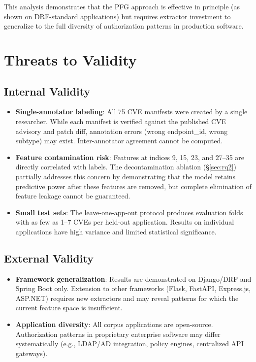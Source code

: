 This analysis demonstrates that the PFG approach is effective in principle (as shown on DRF-standard applications) but requires extractor investment to generalize to the full diversity of authorization patterns in production software.

\section{Threats to Validity}
\label{sec:threats}

\subsection{Internal Validity}

\begin{itemize}
    \item \textbf{Single-annotator labeling}: All 75 CVE manifests were created by a single researcher. While each manifest is verified against the published CVE advisory and patch diff, annotation errors (wrong endpoint\_id, wrong subtype) may exist. Inter-annotator agreement cannot be computed.

    \item \textbf{Feature contamination risk}: Features at indices 9, 15, 23, and 27--35 are directly correlated with labels. The decontamination ablation (\S\ref{sec:rq2}) partially addresses this concern by demonstrating that the model retains predictive power after these features are removed, but complete elimination of feature leakage cannot be guaranteed.

    \item \textbf{Small test sets}: The leave-one-app-out protocol produces evaluation folds with as few as 1--7 CVEs per held-out application. Results on individual applications have high variance and limited statistical significance.
\end{itemize}

\subsection{External Validity}

\begin{itemize}
    \item \textbf{Framework generalization}: Results are demonstrated on Django/DRF and Spring Boot only. Extension to other frameworks (Flask, FastAPI, Express.js, ASP.NET) requires new extractors and may reveal patterns for which the current feature space is insufficient.

    \item \textbf{Application diversity}: All corpus applications are open-source. Authorization patterns in proprietary enterprise software may differ systematically (e.g., LDAP/AD integration, policy engines, centralized API gateways).
\end{itemize}

